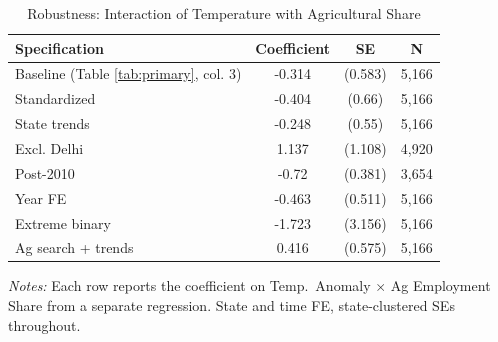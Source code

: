 \begin{table}[htbp]
\centering
\caption{Robustness: Interaction of Temperature with Agricultural Share}
\label{tab:robustness}
\begin{threeparttable}
\begin{tabular}{lccc}
\toprule
Specification & Coefficient & SE & N \\
\midrule
Baseline (Table \ref{tab:primary}, col. 3) & -0.314 & (0.583) & 5,166 \\
Standardized & -0.404 & (0.66) & 5,166 \\
State trends & -0.248 & (0.55) & 5,166 \\
Excl. Delhi & 1.137 & (1.108) & 4,920 \\
Post-2010 & -0.72 & (0.381) & 3,654 \\
Year FE & -0.463 & (0.511) & 5,166 \\
Extreme binary & -1.723 & (3.156) & 5,166 \\
Ag search + trends & 0.416 & (0.575) & 5,166 \\
\bottomrule
\end{tabular}
\begin{tablenotes}[flushleft]
\small
\item \textit{Notes:} Each row reports the coefficient on Temp.\ Anomaly $\times$ Ag Employment Share from a separate regression. State and time FE, state-clustered SEs throughout.
\end{tablenotes}
\end{threeparttable}
\end{table}
